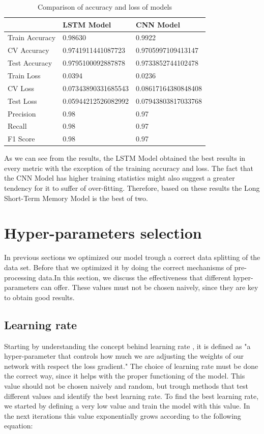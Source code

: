 \documentclass[conference]{IEEEtran}
\begin{document}
\begin{table}[H]
\centering
\caption{Comparison of accuracy and loss of models}
\label{table:comparsion_acc_loss_models}
\begin{tabular}{ | m{7em} | m{2.5cm}| m{2.5cm} | } 
\hline
& LSTM Model & CNN Model \\ 
\hline
Train Accuracy & 0.98630 & 0.9922 \\
\hline
CV Accuracy & 0.9741911441087723 & 0.9705997109413147 \\
\hline
Test Accuracy & 0.9795100092887878 & 0.9733852744102478 \\
\hline
Train Loss & 0.0394 & 0.0236 \\
\hline
CV Loss & 0.07343890331685543 & 0.08617164380848408 \\
\hline
Test Loss & 0.05944212526082992 & 0.07943803817033768 \\
\hline
Precision & 0.98 & 0.97 \\
\hline
Recall & 0.98 & 0.97 \\
\hline
F1 Score & 0.98 & 0.97 \\
\hline
\end{tabular}
\end{table}

As we can see from the results, the LSTM Model obtained the best results in every metric with the exception of the training accuracy and loss. The fact that the CNN Model has higher training statistics might also suggest a greater tendency for it to suffer of over-fitting. Therefore, based on these results the Long Short-Term Memory Model is the best of two.



\section{Hyper-parameters selection}
In previous sections we optimized our model trough a correct data splitting of the data set. Before that we optimized it by doing the correct mechanisms of pre-processing data.In this section, we discuss the effectiveness that different hyper-parameters can offer. These values must not be chosen naively, since they are key to obtain good results.

\subsection{Learning rate}
Starting by understanding the concept behind learning rate \cite{D}, it is defined as "a hyper-parameter that controls how much we are adjusting the weights of our network with respect the loss gradient."
The choice of learning rate must be done the correct way, since it helps with the proper functioning of the model. This value should not be chosen naively and random, but trough methods that test different values and identify the best learning rate. To find the best learning rate, we started by defining a very low value and train the model with this value. In the next iterations this value exponentially grows according to the following equation:
\linebreak
\end{document}
